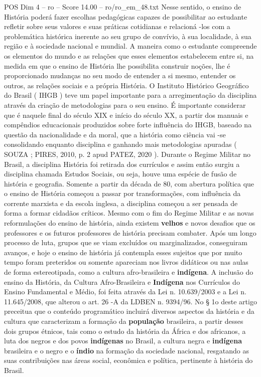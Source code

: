 \begin{textsample}{POS Dim 4 – ro – Score 14.00 – ro/ro\_em\_48.txt}
Nesse sentido, o ensino de História poderá fazer escolhas pedagógicas capazes de possibilitar ao estudante refletir sobre seus valores e suas práticas cotidianas e relacioná -los com a problemática histórica inerente ao seu grupo de convívio, à sua localidade, à sua região e à sociedade nacional e mundial.
A maneira como o estudante compreende os elementos do mundo e as relações que esses elementos estabelecem entre si, na medida em que o ensino de História lhe possibilita construir noções, lhe é proporcionado mudanças no seu modo de entender a si mesmo, entender os outros, as relações sociais e a própria História.
O Instituto Histórico Geográfico do Brasil ( IHGB ) teve um papel importante para a arregimentação da disciplina através da criação de metodologias para o seu ensino.
É importante considerar que é naquele final do século XIX e início do século XX, a partir dos manuais e compêndios educacionais produzidos sobre forte influência do IHGB, baseado na questão da nacionalidade e da moral, que a história como ciência vai -se consolidando enquanto disciplina e ganhando mais metodologias apuradas ( SOUZA ; PIRES, 2010, p. 2 apud PATEZ, 2020 ).
Durante o Regime Militar no Brasil, a disciplina História foi retirada dos currículos e assim então surgiu a disciplina chamada Estudos Sociais, ou seja, houve uma espécie de fusão de história e geografia.
Somente a partir da década de 80, com abertura política que o ensino de História começou a passar por transformações, com influência da corrente marxista e da escola inglesa, a disciplina começou a ser pensada de forma a formar cidadãos críticos.
Mesmo com o fim do Regime Militar e as novas reformulações do ensino de história, ainda existem \textbf{velhos} e novos desafios que os professores e os futuros professores de história precisam combater.
Após um longo processo de luta, grupos que se viam excluídos ou marginalizados, conseguiram avanços, e hoje o ensino de história já contempla esses sujeitos que por muito tempo foram preteridos ou somente apareciam nos livros didáticos ou nas aulas de forma estereotipada, como a cultura afro-brasileira e \textbf{indígena}.
A inclusão do ensino da História, da Cultura Afro-Brasileira e \textbf{Indígena} nos Currículos do Ensino Fundamental e Médio, foi feita através da Lei n. 10.639/2003 e a Lei n. 11.645/2008, que alterou o art. 26 -A da LDBEN n. 9394/96.
No § 1o deste artigo preceitua que o conteúdo programático incluirá diversos aspectos da história e da cultura que caracterizam a formação da \textbf{população} brasileira, a partir desses dois grupos étnicos, tais como o estudo da história da África e dos africanos, a luta dos negros e dos povos \textbf{indígenas} no Brasil, a cultura negra e \textbf{indígena} brasileira e o negro e o \textbf{índio} na formação da sociedade nacional, resgatando as suas contribuições nas áreas social, econômica e política, pertinente à história do Brasil.

\end{textsample}
